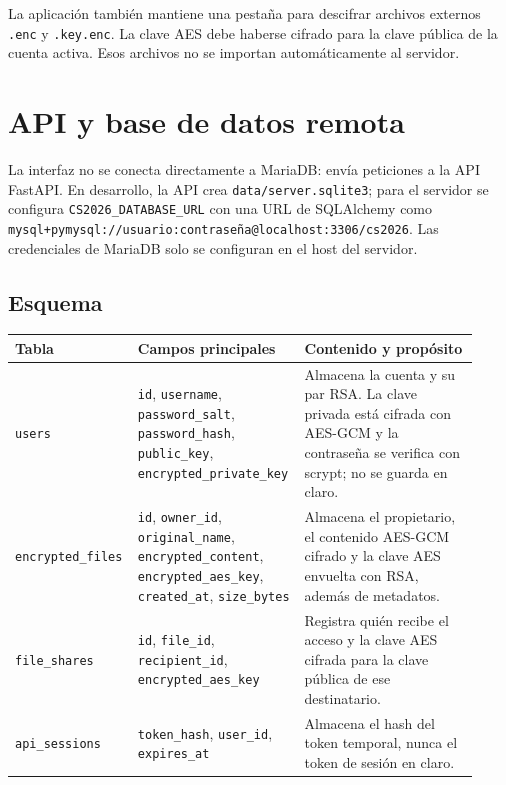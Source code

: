 \documentclass[12pt,a4paper]{article}
\begin{document}
La aplicación también mantiene una pestaña para descifrar archivos externos \texttt{.enc} y \texttt{.key.enc}. La clave AES debe haberse cifrado para la clave pública de la cuenta activa. Esos archivos no se importan automáticamente al servidor.

\section{API y base de datos remota}

La interfaz no se conecta directamente a MariaDB: envía peticiones a la API FastAPI. En desarrollo, la API crea \texttt{data/server.sqlite3}; para el servidor se configura \texttt{CS2026\_DATABASE\_URL} con una URL de SQLAlchemy como \texttt{mysql+pymysql://usuario:contraseña@localhost:3306/cs2026}. Las credenciales de MariaDB solo se configuran en el host del servidor.

\subsection{Esquema}

\begin{center}
\small
\begin{tabular}{p{0.21\linewidth}p{0.34\linewidth}p{0.37\linewidth}}
\toprule
\textbf{Tabla} & \textbf{Campos principales} & \textbf{Contenido y propósito}\\
\midrule
\texttt{users} &
\texttt{id}, \texttt{username}, \texttt{password\_salt}, \texttt{password\_hash}, \texttt{public\_key}, \texttt{encrypted\_private\_key} &
Almacena la cuenta y su par RSA. La clave privada está cifrada con AES-GCM y la contraseña se verifica con scrypt; no se guarda en claro.\\
\addlinespace
\texttt{encrypted\_files} &
\texttt{id}, \texttt{owner\_id}, \texttt{original\_name}, \texttt{encrypted\_content}, \texttt{encrypted\_aes\_key}, \texttt{created\_at}, \texttt{size\_bytes} &
Almacena el propietario, el contenido AES-GCM cifrado y la clave AES envuelta con RSA, además de metadatos.\\
\addlinespace
\texttt{file\_shares} &
\texttt{id}, \texttt{file\_id}, \texttt{recipient\_id}, \texttt{encrypted\_aes\_key} &
Registra quién recibe el acceso y la clave AES cifrada para la clave pública de ese destinatario.\\
\addlinespace
\texttt{api\_sessions} &
\texttt{token\_hash}, \texttt{user\_id}, \texttt{expires\_at} &
Almacena el hash del token temporal, nunca el token de sesión en claro.\\
\bottomrule
\end{tabular}
\end{center}
\end{document}
